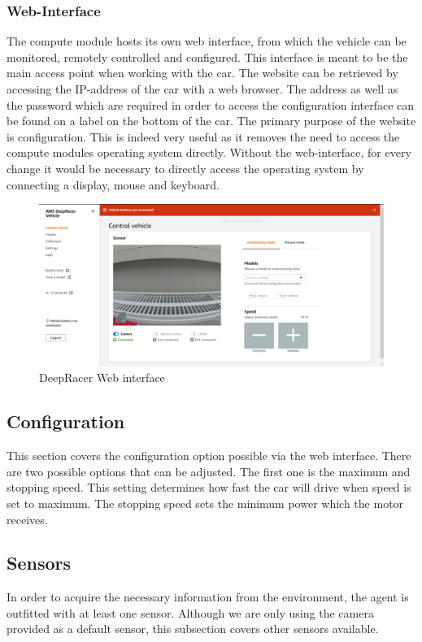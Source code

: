 \subsubsection{Web-Interface}
The compute module hosts its own web interface, from which the vehicle can be monitored, remotely controlled and configured. This interface is meant to be the main access point when working with the car. The website can be retrieved by accessing the IP-address of the car with a web browser. The address as well as the password which are required in order to access the configuration interface can be found on a label on the bottom of the car. The primary purpose of the website is configuration. This is indeed very useful as it removes the need to access the compute modules operating system directly. Without the web-interface, for every change it would be necessary to directly access the operating system by connecting a display, mouse and keyboard.

\begin{figure}
    \centering
    \includegraphics[width=.85\textwidth]{images/deepracer_console_1.png}
    \caption{DeepRacer Web interface}
    \label{fig:web_interface}
\end{figure}

\subsection{Configuration}
This section covers the configuration option possible via the web interface. There are two possible options that can be adjusted. The first one is the maximum and stopping speed. This setting determines how fast the car will drive when speed is set to maximum. The stopping speed sets the minimum power which the motor receives.

\subsection{Sensors}
In order to acquire the necessary information from the environment, the agent is outfitted with at least one sensor. Although we are only using the camera provided as a default sensor, this subsection covers other sensors available.

